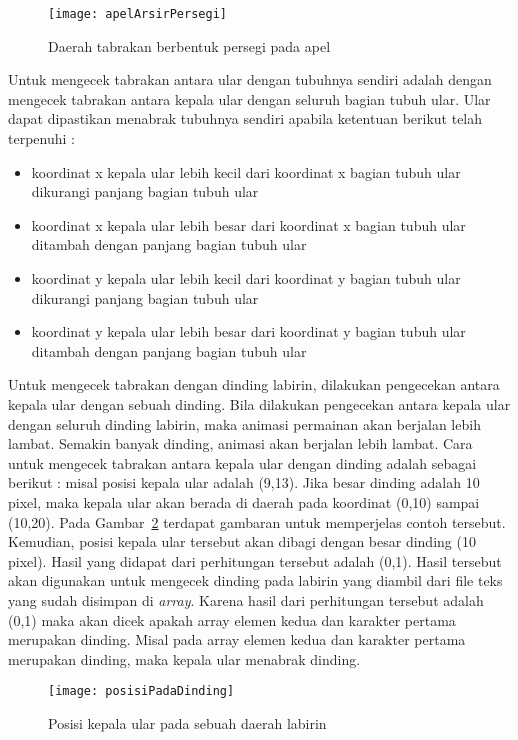 \begin{figure}[H]
	\centering  
	\texttt{[image: apelArsirPersegi]}  
	\caption[Daerah tabrakan berbentuk persegi pada apel]{Daerah tabrakan berbentuk persegi pada apel}
	\label{fig:apelArsirPersegi} 
\end{figure}

Untuk mengecek tabrakan antara ular dengan tubuhnya sendiri adalah dengan mengecek tabrakan antara kepala ular dengan seluruh bagian tubuh ular. Ular dapat dipastikan menabrak tubuhnya sendiri apabila ketentuan berikut telah terpenuhi : 

\begin{itemize}
	\item koordinat x kepala ular lebih kecil dari koordinat x bagian tubuh ular dikurangi panjang bagian tubuh ular
	\item koordinat x kepala ular lebih besar dari koordinat x bagian tubuh ular ditambah dengan panjang bagian tubuh ular
	\item koordinat y kepala ular lebih kecil dari koordinat y bagian tubuh ular dikurangi panjang bagian tubuh ular
	\item koordinat y kepala ular lebih besar dari koordinat y bagian tubuh ular ditambah dengan panjang bagian tubuh ular
\end{itemize}

Untuk mengecek tabrakan dengan dinding labirin, dilakukan pengecekan antara kepala ular dengan sebuah dinding. Bila dilakukan pengecekan antara kepala ular dengan seluruh dinding labirin, maka animasi permainan akan berjalan lebih lambat. Semakin banyak dinding, animasi akan berjalan lebih lambat. Cara untuk mengecek tabrakan antara kepala ular dengan dinding adalah sebagai berikut : misal posisi kepala ular adalah (9,13). Jika besar dinding adalah 10 pixel, maka kepala ular akan berada di daerah pada koordinat (0,10) sampai (10,20). Pada Gambar~\ref{fig:posisiPadaDinding} terdapat gambaran untuk memperjelas contoh tersebut. Kemudian, posisi kepala ular tersebut akan dibagi dengan besar dinding (10 pixel). Hasil yang didapat dari perhitungan tersebut adalah (0,1). Hasil tersebut akan digunakan untuk mengecek dinding pada labirin yang diambil dari file teks yang sudah disimpan di \textit{array}. Karena hasil dari perhitungan tersebut adalah (0,1) maka akan dicek apakah array elemen kedua dan karakter pertama merupakan dinding. Misal pada array elemen kedua dan karakter pertama merupakan dinding, maka kepala ular menabrak dinding.

\begin{figure}[H]
	\centering  
	\texttt{[image: posisiPadaDinding]}  
	\caption[Posisi kepala ular pada sebuah daerah labirin]{Posisi kepala ular pada sebuah daerah labirin}
	\label{fig:posisiPadaDinding} 
\end{figure}


